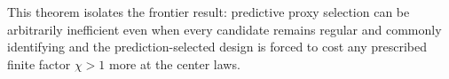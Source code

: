This theorem isolates the frontier result: predictive proxy selection can be arbitrarily inefficient even when every candidate remains regular and commonly identifying and the prediction-selected design is forced to cost any prescribed finite factor \(\chi>1\) more at the center laws.
